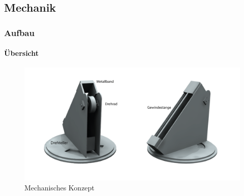 \subsection{Mechanik}

\author{Christian Schürch}

\begin{frame}
	\frametitle{Aufbau\hfill{}\footnotesize \group}
	\framesubtitle{Übersicht}
	\begin{figure}
		\centering
		\includegraphics[width=1\textwidth]{../../fig/StudioLegende.png}
		\caption{Mechanisches Konzept}
	\end{figure}
\end{frame}

